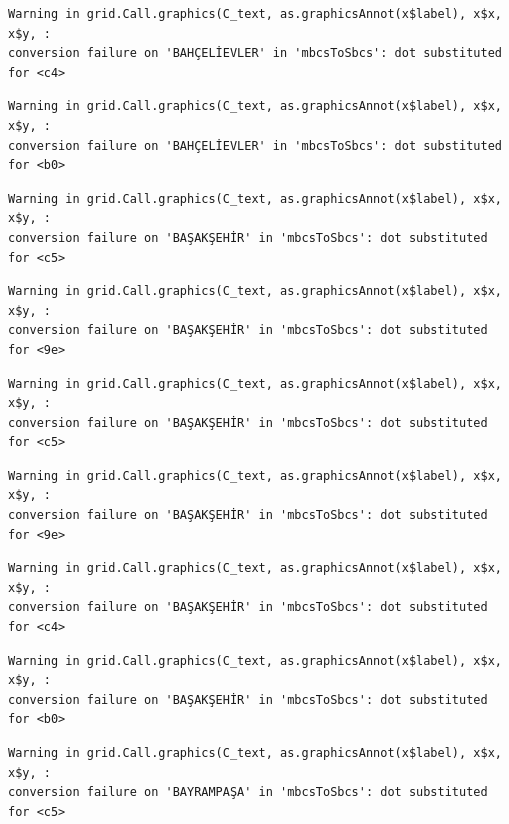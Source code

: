 \documentclass[
  11pt,
  a4paper,
  DIV=11,
  numbers=noendperiod]{scrartcl}
\begin{document}
\begin{verbatim}
Warning in grid.Call.graphics(C_text, as.graphicsAnnot(x$label), x$x, x$y, :
conversion failure on 'BAHÇELİEVLER' in 'mbcsToSbcs': dot substituted for <c4>
\end{verbatim}

\begin{verbatim}
Warning in grid.Call.graphics(C_text, as.graphicsAnnot(x$label), x$x, x$y, :
conversion failure on 'BAHÇELİEVLER' in 'mbcsToSbcs': dot substituted for <b0>
\end{verbatim}

\begin{verbatim}
Warning in grid.Call.graphics(C_text, as.graphicsAnnot(x$label), x$x, x$y, :
conversion failure on 'BAŞAKŞEHİR' in 'mbcsToSbcs': dot substituted for <c5>
\end{verbatim}

\begin{verbatim}
Warning in grid.Call.graphics(C_text, as.graphicsAnnot(x$label), x$x, x$y, :
conversion failure on 'BAŞAKŞEHİR' in 'mbcsToSbcs': dot substituted for <9e>
\end{verbatim}

\begin{verbatim}
Warning in grid.Call.graphics(C_text, as.graphicsAnnot(x$label), x$x, x$y, :
conversion failure on 'BAŞAKŞEHİR' in 'mbcsToSbcs': dot substituted for <c5>
\end{verbatim}

\begin{verbatim}
Warning in grid.Call.graphics(C_text, as.graphicsAnnot(x$label), x$x, x$y, :
conversion failure on 'BAŞAKŞEHİR' in 'mbcsToSbcs': dot substituted for <9e>
\end{verbatim}

\begin{verbatim}
Warning in grid.Call.graphics(C_text, as.graphicsAnnot(x$label), x$x, x$y, :
conversion failure on 'BAŞAKŞEHİR' in 'mbcsToSbcs': dot substituted for <c4>
\end{verbatim}

\begin{verbatim}
Warning in grid.Call.graphics(C_text, as.graphicsAnnot(x$label), x$x, x$y, :
conversion failure on 'BAŞAKŞEHİR' in 'mbcsToSbcs': dot substituted for <b0>
\end{verbatim}

\begin{verbatim}
Warning in grid.Call.graphics(C_text, as.graphicsAnnot(x$label), x$x, x$y, :
conversion failure on 'BAYRAMPAŞA' in 'mbcsToSbcs': dot substituted for <c5>
\end{verbatim}
\end{document}
